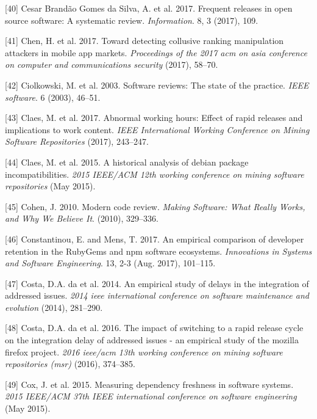 \documentclass[]{book}
\begin{document}
\hypertarget{ref-cesar2017a}{}
{[}40{]} Cesar Brandão Gomes da Silva, A. et al. 2017. Frequent releases
in open source software: A systematic review. \emph{Information}. 8, 3
(2017), 109.

\hypertarget{ref-chen2017toward}{}
{[}41{]} Chen, H. et al. 2017. Toward detecting collusive ranking
manipulation attackers in mobile app markets. \emph{Proceedings of the
2017 acm on asia conference on computer and communications security}
(2017), 58--70.

\hypertarget{ref-ciolkowski2003software}{}
{[}42{]} Ciolkowski, M. et al. 2003. Software reviews: The state of the
practice. \emph{IEEE software}. 6 (2003), 46--51.

\hypertarget{ref-claes2017a}{}
{[}43{]} Claes, M. et al. 2017. Abnormal working hours: Effect of rapid
releases and implications to work content. \emph{IEEE International
Working Conference on Mining Software Repositories} (2017), 243--247.

\hypertarget{ref-Claes2015}{}
{[}44{]} Claes, M. et al. 2015. A historical analysis of debian package
incompatibilities. \emph{2015 IEEE/ACM 12th working conference on mining
software repositories} (May 2015).

\hypertarget{ref-cohen2010modern}{}
{[}45{]} Cohen, J. 2010. Modern code review. \emph{Making Software: What
Really Works, and Why We Believe It}. (2010), 329--336.

\hypertarget{ref-Constantinou2017}{}
{[}46{]} Constantinou, E. and Mens, T. 2017. An empirical comparison of
developer retention in the RubyGems and npm software ecosystems.
\emph{Innovations in Systems and Software Engineering}. 13, 2-3 (Aug.
2017), 101--115.

\hypertarget{ref-da2014a}{}
{[}47{]} Costa, D.A. da et al. 2014. An empirical study of delays in the
integration of addressed issues. \emph{2014 ieee international
conference on software maintenance and evolution} (2014), 281--290.

\hypertarget{ref-da2016a}{}
{[}48{]} Costa, D.A. da et al. 2016. The impact of switching to a rapid
release cycle on the integration delay of addressed issues - an
empirical study of the mozilla firefox project. \emph{2016 ieee/acm 13th
working conference on mining software repositories (msr)} (2016),
374--385.

\hypertarget{ref-Cox2015}{}
{[}49{]} Cox, J. et al. 2015. Measuring dependency freshness in software
systems. \emph{2015 IEEE/ACM 37th IEEE international conference on
software engineering} (May 2015).
\end{document}
